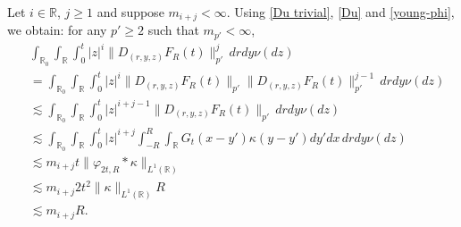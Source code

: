 \documentclass[12pt]{article}
\def\bR{\mathbb{R}}
\newcommand{\les}{\lesssim}
\def\k{\kappa}
\begin{document}
Let $i \in \bR$, $j \geq 1$ and suppose $m_{i+j} < \infty$. Using \eqref{Du trivial}, \eqref{Du} and \eqref{young-phi}, we obtain: for any $p'\geq 2$ such that $m_{p'}<\infty$,
\begin{align}
\nonumber
& \int_{\bR_0} \int_{\bR} \int_0^t |z|^i\| D_{(r,y,z)} F_R(t) \|_{p'}^j \, dr dy \nu(dz) \\
\nonumber
& = \int_{\bR_0} \int_{\bR} \int_0^t |z|^i\| D_{(r,y,z)} F_R(t) \|_{p'}\| D_{(r,y,z)} F_R(t) \|_{p'}^{j-1} \, dr dy \nu(dz) \\
\nonumber
& \les \int_{\bR_0} \int_{\bR} \int_0^t |z|^{i+j-1}\| D_{(r,y,z)} F_R(t) \|_{p'} \, dr dy \nu(dz) \\
\nonumber
& \les \int_{\bR_0} \int_{\bR} \int_0^t |z|^{i+j} \int_{-R}^R \int_{\bR}G_{t}(x-y') \k(y-y')dy'dx \, dr dy \nu(dz) \\
\nonumber
& \les m_{i+j} t \| \varphi_{2t,R} * \k \|_{L^1(\bR)} \\
\nonumber
& \les  m_{i+j} 2t^2 \|\k\|_{L^1(\bR)}R \\
\label{Du v2}
& \les m_{i+j} R.
\end{align}
\end{document}
